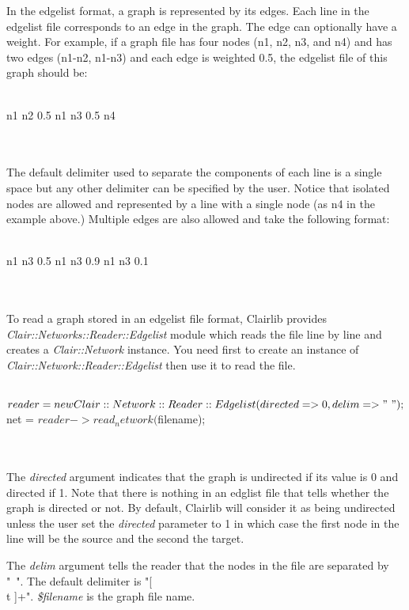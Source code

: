 In the edgelist format, a graph is represented by its edges. Each line in the edgelist file corresponds to an edge in the graph. The edge can optionally have a weight. For example, if a graph file has four nodes (n1, n2, n3, and n4) and has two edges (n1-n2, n1-n3) and each edge is weighted 0.5, the edgelist file of this graph should be:
\\
\\
\begin{boxedverbatim}
n1 n2 0.5
n1 n3 0.5
n4
\end{boxedverbatim}
\\
\\
The default delimiter used to separate the components of each line is a single space but any other delimiter can be specified by the user. Notice that isolated nodes are allowed and represented by a line with a single node (as n4 in the example above.) Multiple edges are also allowed and take the following format:
\\
\\
\begin{boxedverbatim}
n1 n3 0.5
n1 n3 0.9
n1 n3 0.1
\end{boxedverbatim}
\\
\\
To read a graph stored in an edgelist file format, Clairlib provides \emph{Clair::Networks::Reader::Edgelist} module which reads the file line by line and creates a \emph{Clair::Network} instance. You need first to create an instance of \emph{Clair::Network::Reader::Edgelist} then use it to read the file.
\\
\\
\begin{boxedverbatim}
$reader = new Clair::Network::Reader::Edgelist(directed=>0, delim=>"~");
$net = $reader->read_network($filename);
\end{boxedverbatim}
\\
\\
The \emph{directed} argument indicates that the graph is undirected if its value is 0 and directed if 1. Note that there is nothing in an edglist file that tells whether the graph is directed or not. By default, Clairlib will consider it as being undirected unless the user set the \emph{directed} parameter to 1 in which case the first node in the line will be the source and the second the target.

The \emph{delim} argument tells the reader that the nodes in the file are separated by "~". The default delimiter is "[\\t ]+". \emph{\$filename} is the graph file name.

